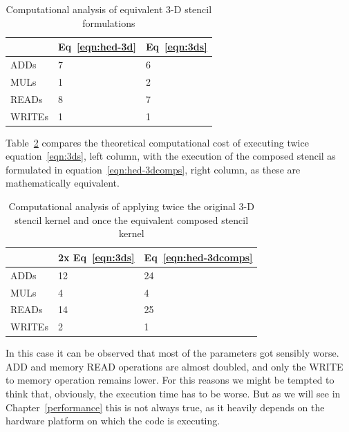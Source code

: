 \documentclass{acm_proc_article-sp}
\begin{document}
\begin{table}[ht]
\begin{center}
  \begin{tabular}{| l | l | l |}\hline
    & Eq~\eqref{eqn:hed-3d} & Eq~\ref{eqn:3ds} \\ \hline
    ADDs   & 7 & 6 \\ \hline
    MULs   & 1 & 2 \\ \hline
    READs  & 8 & 7 \\ \hline
    WRITEs & 1 & 1 \\ \hline
  \end{tabular}
    \caption{Computational analysis of equivalent 3-D stencil formulations}
    \label{tbl:3d-s01a}
\end{center}
\end{table}

Table~\ref{tbl:3d-s02a} compares the theoretical computational cost of executing twice equation~\eqref{eqn:3ds}, left column, with the execution of the composed stencil as formulated in equation~\eqref{eqn:hed-3dcomps}, right column, as these are mathematically equivalent.
\begin{table}[ht]
  \begin{center}
    \begin{tabular}{| l | l | l |} \hline
      & 2x Eq~\eqref{eqn:3ds} & Eq~\eqref{eqn:hed-3dcomps} \\ \hline
      ADDs   & 12 & 24 \\ \hline
      MULs   & 4 & 4 \\ \hline
      READs  & 14 & 25 \\ \hline
      WRITEs & 2 & 1  \\ \hline
    \end{tabular}
    \caption{Computational analysis of applying twice the original 3-D stencil kernel and once the equivalent composed stencil kernel}
    \label{tbl:3d-s02a}
  \end{center}
\end{table}

In this case it can be observed that most of the parameters got sensibly worse. ADD and memory READ operations are almost doubled, and only the WRITE to memory operation remains lower. For this reasons we might be tempted to think that, obviously, the execution time has to be worse. But as we will see in Chapter~\ref{performance} this is not always true, as it heavily depends on the hardware platform on which the code is executing.

\end{document}

